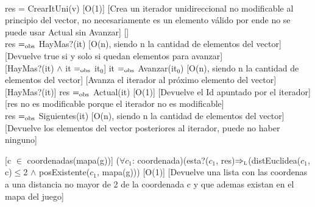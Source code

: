 

\\

{res = CrearItUni(v)}
[O(1)]
[Crea un iterador unidireccional no modificable al principio del vector, no necesariamente es un elemento válido por ende no se puede usar Actual sin Avanzar]
[]\\

{res $=_{\mathrm{obs}}$ HayMas?(it)}
[O(n), siendo n la cantidad de elementos del vector]
[Devuelve true si y solo si quedan elementos para avanzar]\\

[HayMas?(it) $\wedge$ it $=_{\mathrm{obs}}$ it$_0$]
{it $=_{\mathrm{obs}}$ Avanzar(it$_0$)}
[O(n), siendo n la cantidad de elementos del vector]
[Avanza el iterador al próximo elemento del vector]\\

[HayMas?(it)]
{res $=_{\mathrm{obs}}$ Actual(it)}
[O(1)]
[Devuelve el Id apuntado por el iterador]
[res no es modificable porque el iterador no es modificable]\\

{res $=_{\mathrm{obs}}$ Siguientes(it)}
[O(n), siendo n la cantidad de elementos del vector]
[Devuelve los elementos del vector posteriores al iterador, puede no haber ninguno]\\


[c $\in$ coordenadas(mapa(g))]
{($\forall c_1$: coordenada)(esta?($c_1$, res)$\Rightarrow_{\mathrm{\scriptscriptstyle{L}}}$(distEuclidea($c_1$, c)$\leq$2  $\wedge$ posExistente($c_1$, mapa(g)))}
[O(1)]
[Devuelve una lista con las coordenas a una distancia no mayor de 2 de la coordenada c y que ademas existan en el mapa del juego]


